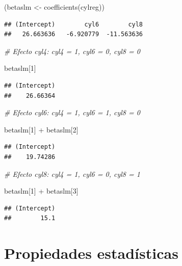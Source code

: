 \documentclass[
  12pt,
]{book}
\newenvironment{Shaded}{\begin{snugshade}}{\end{snugshade}}
\newcommand{\CommentTok}[1]{\textcolor[rgb]{0.56,0.35,0.01}{\textit{#1}}}
\newcommand{\DecValTok}[1]{\textcolor[rgb]{0.00,0.00,0.81}{#1}}
\newcommand{\FunctionTok}[1]{\textcolor[rgb]{0.00,0.00,0.00}{#1}}
\newcommand{\NormalTok}[1]{#1}
\newcommand{\OtherTok}[1]{\textcolor[rgb]{0.56,0.35,0.01}{#1}}
\newcommand{\SpecialCharTok}[1]{\textcolor[rgb]{0.00,0.00,0.00}{#1}}
\theoremstyle{definition}
\theoremstyle{definition}
\theoremstyle{definition}
\theoremstyle{remark}
\begin{document}
\begin{Shaded}
\begin{Highlighting}[]
\NormalTok{(betaslm }\OtherTok{\textless{}{-}} \FunctionTok{coefficients}\NormalTok{(cylreg))}
\end{Highlighting}
\end{Shaded}

\begin{verbatim}
## (Intercept)        cyl6        cyl8 
##   26.663636   -6.920779  -11.563636
\end{verbatim}

\begin{Shaded}
\begin{Highlighting}[]
\CommentTok{\# Efecto cyl4: cyl4 = 1, cyl6 = 0, cyl8 = 0}

\NormalTok{betaslm[}\DecValTok{1}\NormalTok{]}
\end{Highlighting}
\end{Shaded}

\begin{verbatim}
## (Intercept) 
##    26.66364
\end{verbatim}

\begin{Shaded}
\begin{Highlighting}[]
\CommentTok{\# Efecto cyl6: cyl4 = 1, cyl6 = 1, cyl8 = 0}

\NormalTok{betaslm[}\DecValTok{1}\NormalTok{] }\SpecialCharTok{+}\NormalTok{ betaslm[}\DecValTok{2}\NormalTok{]}
\end{Highlighting}
\end{Shaded}

\begin{verbatim}
## (Intercept) 
##    19.74286
\end{verbatim}

\begin{Shaded}
\begin{Highlighting}[]
\CommentTok{\# Efecto cyl8: cyl4 = 1, cyl6 = 0, cyl8 = 1}

\NormalTok{betaslm[}\DecValTok{1}\NormalTok{] }\SpecialCharTok{+}\NormalTok{ betaslm[}\DecValTok{3}\NormalTok{]}
\end{Highlighting}
\end{Shaded}

\begin{verbatim}
## (Intercept) 
##        15.1
\end{verbatim}

\hypertarget{propiedades-estaduxedsticas-2}{%
\section{Propiedades estadísticas}\label{propiedades-estaduxedsticas-2}}
\end{document}
